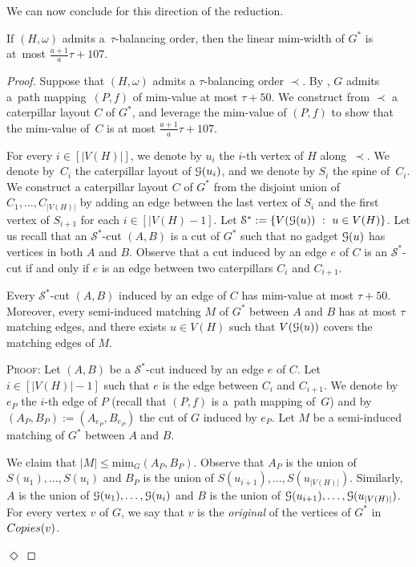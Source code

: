 \documentclass[a4paper,UKenglish,cleveref,hyperref,autoref]{lipics-v2021}
\renewcommand{\leq}{\leqslant}
\newenvironment{proofofclaim}{\noindent \textsc{Proof:}}{\hfill$\Diamond$\medskip}
\newcommand{\mim}{\text{mim}}
\newcommand{\pmap}{path mapping\xspace}
\begin{document}
We can now conclude for this direction of the reduction.

\begin{lemma}
If $(H, \omega)$ admits a~$\tau$-balancing order, then the linear mim-width of $G^*$ is at~most $\frac{a+1}{a} \tau + 107$.
\end{lemma}
\begin{proof}
	Suppose that $(H, \omega)$ admits a $\tau$-balancing order $\prec$.
	By , $G$ admits a~\pmap~$(P, f)$ of mim-value at most $\tau + 50$.
	We construct from $\prec$ a caterpillar layout $C$ of $G^*$, and leverage the mim-value of $(P, f)$ to show that the mim-value of~$C$ is at most $\frac{a+1}{a} \tau + 107$.
	
	For every $i \in [|V(H)|]$, we denote by $u_i$ the $i$-th vertex of $H$ along~$\prec$.
	We denote by~$C_i$ the caterpillar layout of $\mathcal G(u_i)$, and we denote by $S_i$ the spine of~$C_i$.	
	We construct a caterpillar layout $C$ of $G^*$ from the disjoint union of $C_1,\dots,C_{|V(H)|}$ by adding an edge between the last vertex of $S_i$ and the first vertex of $S_{i+1}$ for each $i\in [|V(H)-1]$.
	Let $\mathcal S^* :=\{ V(\mathcal G(u))~:~u\in V(H)\}$.
	Let us recall that an $\mathcal S^*$-cut $(A,B)$ is a cut of $G^*$ such that no gadget $\mathcal G(u)$ has vertices in both $A$ and $B$. 
	Observe that a cut induced by an edge $e$ of $C$ is an $\mathcal S^*$-cut if and only if $e$ is an edge between two caterpillars $C_i$ and $C_{i+1}$.
	
	\begin{claim}\label{claim:glue-edges}
		Every $\mathcal S^*$-cut $(A,B)$ induced by an edge of $C$ has mim-value at most $\tau + 50$.
		Moreover, every semi-induced matching $M$ of $G^*$ between $A$ and $B$ has at most $\tau$ matching edges, and there exists $u\in V(H)$ such that $V(\mathcal G(u))$ covers the matching edges of $M$.
	\end{claim}
	\begin{proofofclaim}		
		Let $(A,B)$ be a $\mathcal S^*$-cut induced by an edge $e$ of $C$.
		Let $i\in [|V(H)|-1]$ such that $e$ is the edge between $C_i$ and $C_{i+1}$.
		We denote by $e_P$ the $i$-th edge of $P$ (recall that $(P,f)$ is a~\pmap of~$G$) and by $(A_P,B_P) := (A_{e_P}, B_{e_P})$ the cut of $G$ induced by $e_P$.
		Let $M$ be a semi-induced matching of $G^*$ between $A$ and $B$.
		
		We claim that $|M| \leq \mim_{G}(A_P,B_P)$.
		Observe that $A_P$ is the union of $S(u_1),\dots,S(u_i)$ and $B_P$ is the union of $S(u_{i+1}),\dots,S(u_{|V(H)|})$.
		Similarly, $A$ is the union of $\mathcal G(u_1),\dots,\mathcal G(u_i)$ and $B$ is the union of $\mathcal G(u_{i+1}),\dots,\mathcal G(u_{|V(H)|})$.
		For every vertex $v$ of $G$, we say that $v$ is the \emph{original} of the vertices of $G^*$ in $\copies(v)$.
		

\end{proofofclaim}
\end{proof}
\end{document}
